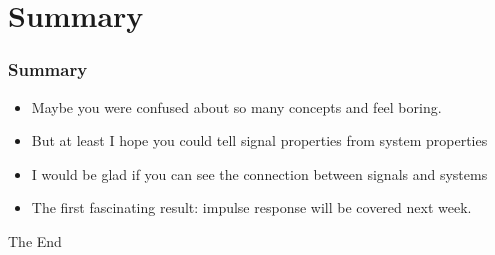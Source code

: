 \documentclass{beamer}
\begin{document}
\section{Summary}
\begin{frame}
    \frametitle{Summary}
    \begin{itemize}
        \item Maybe you were confused about so many concepts and feel boring. 
        \item But at least I hope you could tell signal properties from system properties
        \item I would be glad if you can see the connection between signals and systems
        \item The first fascinating result: impulse response will be covered next week.
       
    \end{itemize}
    
\end{frame}


\begin{frame}
\Huge{\centerline{The End}}
\end{frame}

\end{document}
